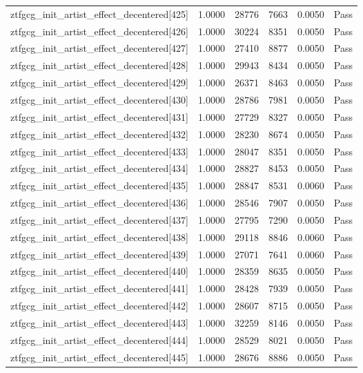 \begin{table}[htbp]
\begin{tabular}{llrrll}
ztfgcg\_init\_artist\_effect\_decentered[425] & 1.0000 & 28776 & 7663 & 0.0050 & Pass \\
ztfgcg\_init\_artist\_effect\_decentered[426] & 1.0000 & 30224 & 8351 & 0.0050 & Pass \\
ztfgcg\_init\_artist\_effect\_decentered[427] & 1.0000 & 27410 & 8877 & 0.0050 & Pass \\
ztfgcg\_init\_artist\_effect\_decentered[428] & 1.0000 & 29943 & 8434 & 0.0050 & Pass \\
ztfgcg\_init\_artist\_effect\_decentered[429] & 1.0000 & 26371 & 8463 & 0.0050 & Pass \\
ztfgcg\_init\_artist\_effect\_decentered[430] & 1.0000 & 28786 & 7981 & 0.0050 & Pass \\
ztfgcg\_init\_artist\_effect\_decentered[431] & 1.0000 & 27729 & 8327 & 0.0050 & Pass \\
ztfgcg\_init\_artist\_effect\_decentered[432] & 1.0000 & 28230 & 8674 & 0.0050 & Pass \\
ztfgcg\_init\_artist\_effect\_decentered[433] & 1.0000 & 28047 & 8351 & 0.0050 & Pass \\
ztfgcg\_init\_artist\_effect\_decentered[434] & 1.0000 & 28827 & 8453 & 0.0050 & Pass \\
ztfgcg\_init\_artist\_effect\_decentered[435] & 1.0000 & 28847 & 8531 & 0.0060 & Pass \\
ztfgcg\_init\_artist\_effect\_decentered[436] & 1.0000 & 28546 & 7907 & 0.0050 & Pass \\
ztfgcg\_init\_artist\_effect\_decentered[437] & 1.0000 & 27795 & 7290 & 0.0050 & Pass \\
ztfgcg\_init\_artist\_effect\_decentered[438] & 1.0000 & 29118 & 8846 & 0.0060 & Pass \\
ztfgcg\_init\_artist\_effect\_decentered[439] & 1.0000 & 27071 & 7641 & 0.0060 & Pass \\
ztfgcg\_init\_artist\_effect\_decentered[440] & 1.0000 & 28359 & 8635 & 0.0050 & Pass \\
ztfgcg\_init\_artist\_effect\_decentered[441] & 1.0000 & 28428 & 7939 & 0.0050 & Pass \\
ztfgcg\_init\_artist\_effect\_decentered[442] & 1.0000 & 28607 & 8715 & 0.0050 & Pass \\
ztfgcg\_init\_artist\_effect\_decentered[443] & 1.0000 & 32259 & 8146 & 0.0050 & Pass \\
ztfgcg\_init\_artist\_effect\_decentered[444] & 1.0000 & 28529 & 8021 & 0.0050 & Pass \\
ztfgcg\_init\_artist\_effect\_decentered[445] & 1.0000 & 28676 & 8886 & 0.0050 & Pass \\

\end{tabular}
\end{table}
